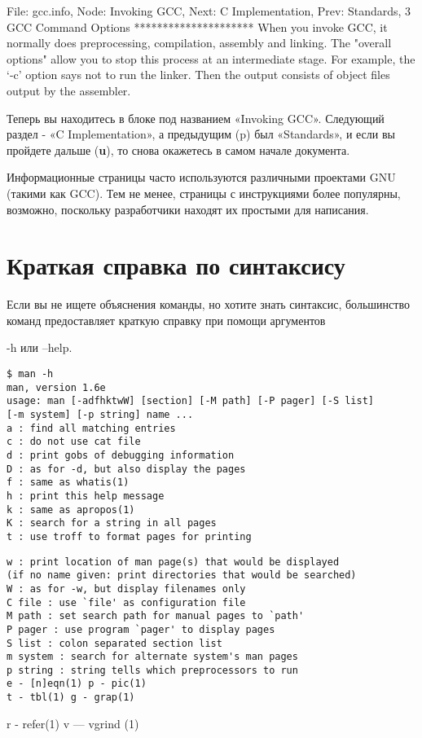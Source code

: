 \documentclass[12pt]{book}
\begin{document}
\vspace{3mm}
\begin{tcolorbox}
File: gcc.info, Node: Invoking GCC, Next: C Implementation, Prev: Standards,
3 GCC Command Options
*********************
When you invoke GCC, it normally does preprocessing, compilation,
assembly and linking. The "overall options" allow you to stop this
process at an intermediate stage. For example, the `-c' option says
not to run the linker. Then the output consists of object files output
by the assembler.
\end{tcolorbox}

Теперь вы находитесь в блоке под названием «Invoking GCC». Следующий раздел - «C Implementation», а предыдущим (p) был «Standards», и если вы пройдете дальше (\textbf{u}), то снова окажетесь в самом начале документа.

Информационные страницы часто используются  различными проектами GNU (такими как GCC). Тем не менее, страницы с инструкциями более популярны, возможно, поскольку разработчики находят их простыми для написания. 

\section{Краткая справка по синтаксису}

Если вы не ищете объяснения команды, но хотите знать синтаксис, большинство команд предоставляет краткую справку при помощи аргументов

\vspace{3mm}
\begin{tcolorbox}
-h или --help.
\begin{lstlisting}
$ man -h
man, version 1.6e
usage: man [-adfhktwW] [section] [-M path] [-P pager] [-S list]
[-m system] [-p string] name ...
a : find all matching entries
c : do not use cat file
d : print gobs of debugging information
D : as for -d, but also display the pages
f : same as whatis(1)
h : print this help message
k : same as apropos(1)
K : search for a string in all pages
t : use troff to format pages for printing
\end{lstlisting}
\end{tcolorbox}
\vspace{3mm}
\begin{tcolorbox}
\begin{lstlisting}
w : print location of man page(s) that would be displayed
(if no name given: print directories that would be searched)
W : as for -w, but display filenames only
C file : use `file' as configuration file
M path : set search path for manual pages to `path'
P pager : use program `pager' to display pages
S list : colon separated section list
m system : search for alternate system's man pages
p string : string tells which preprocessors to run
e - [n]eqn(1) p - pic(1)
t - tbl(1) g - grap(1)
\end{lstlisting}
r - refer(1) v — vgrind (1)
\end{tcolorbox}
\end{document}
